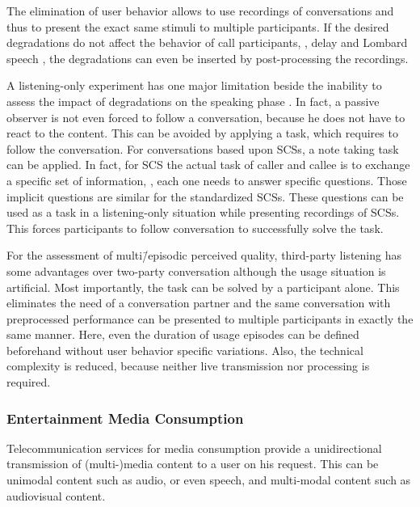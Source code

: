 The elimination of user behavior allows to use recordings of conversations and thus to present the exact same stimuli to multiple participants.
If the desired degradations do not affect the behavior of call participants, \eg, delay and Lombard speech \citep[][p.~161]{moller_assessment_2000}, the degradations can even be inserted by post-processing the recordings.

A listening-only experiment has one major limitation beside the inability to assess the impact of degradations on the speaking phase \citep{gueguin_evaluation_2008}.
In fact, a passive observer is not even forced to follow a conversation, because he does not have to react to the content.
This can be avoided by applying a task, which requires to follow the conversation.
For conversations based upon \acp{SCS}, a note taking task can be applied.
In fact, for \ac{SCS} the actual task of caller and callee is to exchange a specific set of information, \ie, each one needs to answer specific questions.
Those implicit questions are similar for the standardized \acp{SCS}.
These questions can be used as a task in a listening-only situation while presenting recordings of \acp{SCS}.
This forces participants to follow conversation to successfully solve the task.

For the assessment of multi\=/episodic perceived quality, third-party listening has some advantages over two-party conversation although the usage situation is artificial.
Most importantly, the task can be solved by a participant alone.
This eliminates the need of a conversation partner and the same conversation with preprocessed performance can be presented to multiple participants in exactly the same manner.
Here, even the duration of usage episodes can be defined beforehand without user behavior specific variations.
Also, the technical complexity is reduced, because neither live transmission nor processing is required.

\subsubsection*{Entertainment Media Consumption}
Telecommunication services for media consumption provide a unidirectional transmission of (multi-)media content to a user on his request.
This can be unimodal content such as audio, or even speech, and multi-modal content such as audiovisual content.

